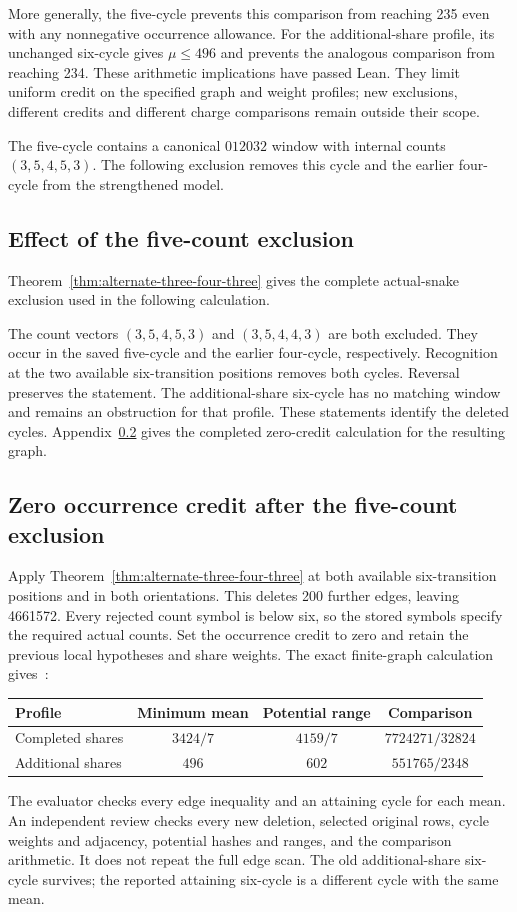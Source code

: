 \documentclass[11pt,a4paper]{article}
\theoremstyle{definition}
\theoremstyle{remark}
\begin{document}
More generally, the five-cycle prevents this comparison from reaching 235
even with any nonnegative occurrence allowance. For the additional-share
profile, its unchanged six-cycle gives $\mu\le496$ and prevents the analogous
comparison from reaching 234. These arithmetic implications have passed
Lean. They limit uniform credit on the specified graph and weight profiles;
new exclusions, different credits and different charge comparisons remain
outside their scope.

The five-cycle contains a canonical $012032$ window with internal counts
$(3,5,4,5,3)$. The following exclusion removes this cycle and the earlier
four-cycle from the strengthened model.

\subsection{Effect of the five-count exclusion}
Theorem~\ref{thm:alternate-three-four-three} gives the complete actual-snake
exclusion used in the following calculation.


The count vectors $(3,5,4,5,3)$ and $(3,5,4,4,3)$ are both excluded.
They occur in the saved five-cycle and the earlier four-cycle, respectively.
Recognition at the two available six-transition positions removes both
cycles. Reversal preserves the statement. The additional-share six-cycle
has no matching window and remains an obstruction for that profile.
These statements identify the deleted cycles. Appendix~\ref{sec:zero-credit-exclusion}
gives the completed zero-credit calculation for the resulting graph.

\subsection{Zero occurrence credit after the five-count exclusion}\label{sec:zero-credit-exclusion}
Apply Theorem~\ref{thm:alternate-three-four-three} at both available
six-transition positions and in both orientations. This deletes 200 further
edges, leaving 4661572. Every rejected count symbol is below six, so the
stored symbols specify the required actual counts. Set the occurrence
credit to zero and retain the previous local hypotheses and share weights.
The exact finite-graph calculation gives~\cite{zerocredit141archive}:
\begin{center}
\begin{tabular}{lccc}
\toprule
Profile & Minimum mean & Potential range & Comparison\\
\midrule
Completed shares & $3424/7$ & $4159/7$ & $7724271/32824$\\
Additional shares & $496$ & $602$ & $551765/2348$\\
\bottomrule
\end{tabular}
\end{center}
The evaluator checks every edge inequality and an attaining cycle for each
mean. An independent review checks every new deletion, selected original
rows, cycle weights and adjacency, potential hashes and ranges, and the
comparison arithmetic. It does not repeat the full edge scan. The old
additional-share six-cycle survives; the reported attaining six-cycle is
a different cycle with the same mean.
\end{document}
